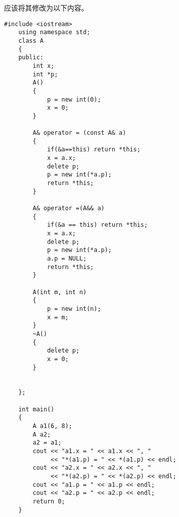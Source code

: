 \documentclass[UTF8]{ctexart}
\begin{document}
应该将其修改为以下内容。
\begin{lstlisting}[language={[ANSI]C++}]
    #include <iostream>
    using namespace std;
    class A
    {
    public:
        int x;
        int *p;
        A()
        {
            p = new int(0);
            x = 0;
        }
    
        A& operator = (const A& a)
        {
            if(&a==this) return *this;
            x = a.x;
            delete p;
            p = new int(*a.p);
            return *this;
        }
    
        A& operator =(A&& a)
        {
            if(&a == this) return *this;
            x = a.x;
            delete p;
            p = new int(*a.p);
            a.p = NULL;
            return *this;
        }
    
        A(int m, int n)
        {
            p = new int(n);
            x = m;
        }
        ~A()
        {
            delete p;
            x = 0;
        }
    
    
    };
    
    int main()
    {
        A a1(6, 8);
        A a2;
        a2 = a1;
        cout << "a1.x = " << a1.x << ", "
             << "*(a1.p) = " << *(a1.p) << endl;
        cout << "a2.x = " << a2.x << ", "
             << "*(a2.p) = " << *(a2.p) << endl;
        cout << "a1.p = " << a1.p << endl;
        cout << "a2.p = " << a2.p << endl;
        return 0;
    }
 \end{lstlisting}
\end{document}
